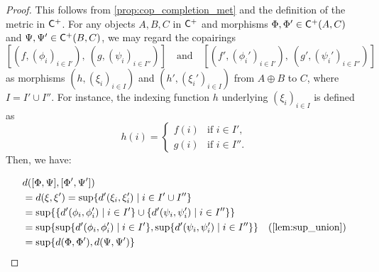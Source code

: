 \begin{proof}
  This follows from \autoref{prop:cop_completion_met} and the definition of the metric in $\mathsf{C}^+$. For any objects $A, B, C$ in $\mathsf{C}^+$ and morphisms $\Phi, \Phi' \in \mathsf{C}^+(A, C)$ and $\Psi, \Psi' \in \mathsf{C}^+(B, C)$, we may regard the copairings
\[
[(f,(\phi_i)_{i \in I'}),\ (g,(\psi_i)_{i \in I''})] \quad \text{and} \quad [(f',(\phi_i')_{i \in I'}),\ (g',(\psi_i')_{i \in I''})]
\]
as morphisms $(h,(\xi_i)_{i \in I})$ and $(h',(\xi_i')_{i \in I})$ from $A \oplus B$ to $C$, where $I = I' \cup I''$. For instance, the indexing function $h$ underlying $(\xi_i)_{i \in I}$ is defined as
\[
h(i) =
\begin{cases}
f(i) & \text{if } i \in I', \\
g(i) & \text{if } i \in I''.
\end{cases}
\]
Then, we have:

  \begin{align*}
    &d([\Phi, \Psi],[\Phi', \Psi'])  \\
    &= d ( \xi, \xi') = \sup\{d'(\xi_i, \xi'_i) \;\vert\; i \in I' \cup I'' \} \\
    & = \sup \{ \{d'(\phi_i, \phi'_i)\;\vert\; i \in I'\}  \cup \{d'(\psi_i, \psi'_i) \;\vert\; i \in I'' \} \} \\
    & = \sup \{ \sup  \{d'(\phi_i, \phi'_i)\;\vert\; i \in I'\}, \sup \{d'(\psi_i, \psi'_i) \;\vert\; i \in I'' \} \} & (\text{\autoref{lem:sup_union}}) \\
    & = \sup \{ d(\Phi,\Phi'), d(\Psi,\Psi') \}
  \end{align*}
\end{proof}




